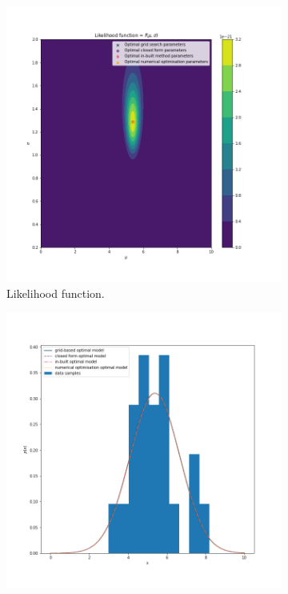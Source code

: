 \documentclass{article}
\begin{document}
\begin{figure}[!htb]
     \centering
     \begin{subfigure}[b]{0.45\textwidth}
         \centering
         \includegraphics[width=\textwidth]{Q1b_fig2.png}
         \caption{Likelihood function.}
     \end{subfigure}
     \hfill
     \begin{subfigure}[b]{0.45\textwidth}
         \centering
         \includegraphics[width=\textwidth]{Q1b_fig3.png}

\end{subfigure}
\end{figure}
\end{document}
